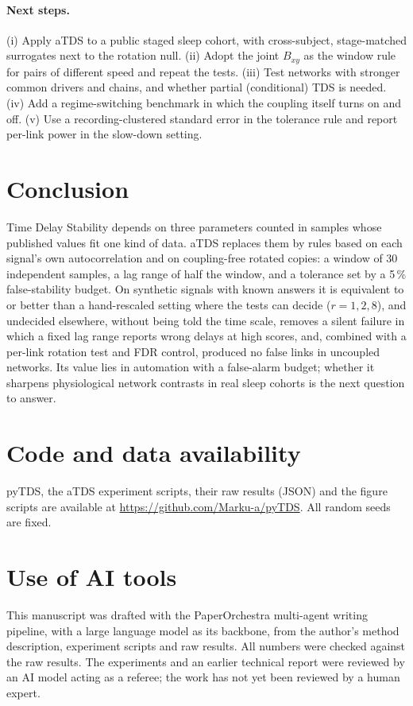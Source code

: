 \documentclass[11pt,a4paper]{article}
\begin{document}
\paragraph{Next steps.} (i) Apply aTDS to a public staged sleep cohort, with cross-subject, stage-matched surrogates next to the rotation null. (ii) Adopt the joint $B_{xy}$ as the window rule for pairs of different speed and repeat the tests. (iii) Test networks with stronger common drivers and chains, and whether partial (conditional) TDS is needed. (iv) Add a regime-switching benchmark in which the coupling itself turns on and off. (v) Use a recording-clustered standard error in the tolerance rule and report per-link power in the slow-down setting.

\section{Conclusion}
\label{sec:conclusion}
Time Delay Stability depends on three parameters counted in samples whose published values fit one kind of data. aTDS replaces them by rules based on each signal's own autocorrelation and on coupling-free rotated copies: a window of 30 independent samples, a lag range of half the window, and a tolerance set by a 5\,\% false-stability budget. On synthetic signals with known answers it is equivalent to or better than a hand-rescaled setting where the tests can decide ($r = 1, 2, 8$), and undecided elsewhere, without being told the time scale, removes a silent failure in which a fixed lag range reports wrong delays at high scores, and, combined with a per-link rotation test and FDR control, produced no false links in uncoupled networks. Its value lies in automation with a false-alarm budget; whether it sharpens physiological network contrasts in real sleep cohorts is the next question to answer.

\section*{Code and data availability}
pyTDS, the aTDS experiment scripts, their raw results (JSON) and the figure scripts are available at \url{https://github.com/Marku-a/pyTDS}. All random seeds are fixed.

\section*{Use of AI tools}
This manuscript was drafted with the PaperOrchestra multi-agent writing pipeline, with a large language model as its backbone, from the author's method description, experiment scripts and raw results. All numbers were checked against the raw results. The experiments and an earlier technical report were reviewed by an AI model acting as a referee; the work has not yet been reviewed by a human expert.




\end{document}
